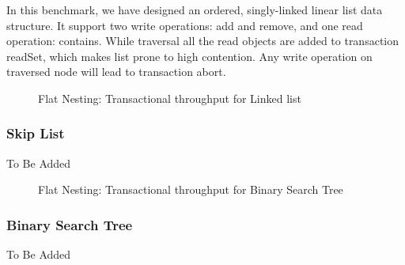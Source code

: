 \documentclass[12pt,english]{report}
\begin{document}
In this benchmark, we have designed an ordered, singly-linked linear list data structure. It support two write operations: add and remove, and one read operation: contains. While traversal all the read objects are added to transaction readSet, which makes list prone to high contention. Any write operation on traversed node will lead to transaction abort.  

\begin{figure}[H]
\centering
{}
\qquad
{}
\end{figure}

\begin{figure}[H]
\caption{Flat Nesting: Transactional throughput for Linked list}
\label{Fig:flatList}
\end{figure}

\subsubsection{Skip List}

To Be Added 

\begin{figure}[H]
\centering
{}
\qquad
{}
\end{figure}

\begin{figure}[H]
\caption{Flat Nesting: Transactional throughput for Binary Search Tree}
\label{Fig:flatBst}
\end{figure}

\subsubsection{Binary Search Tree}
To Be Added 

\begin{figure}[H]
\centering
{}
\qquad
{}
\end{figure}
\end{document}
